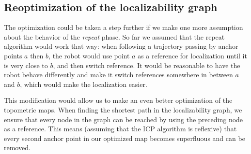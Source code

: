 \documentclass[letterpaper,10 pt,conference]{ieeeconf}
\begin{document}
\subsection{Reoptimization of the localizability graph}

The optimization could be taken a step further if we make one more assumption about the behavior
of the \textit{repeat} phase. So far we assumed that the repeat algorithm would work that way: when
following a trajectory passing by anchor points $a$ then $b$, the robot would use point $a$ as a
reference for localization until it is very close to $b$, and then switch reference. It would be
reasonable to have the robot behave differently and make it switch references somewhere in between
$a$ and $b$, which would make the localization easier.

This modification would allow us to make an even better optimization of the topometric maps. When
finding the shortest path in the localizability graph, we ensure that every node in the graph can be
reached by using the preceding node as a reference. This means (assuming that the ICP algorithm is
reflexive) that every second anchor point in our optimized map becomes superfluous and can be removed.
\end{document}
